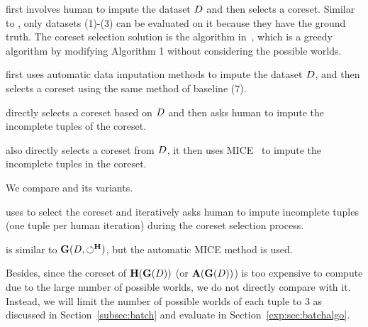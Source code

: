  first involves human to impute the dataset $D$ and then selects a coreset. Similar to \truth, only datasets (1)-(3) can be evaluated on it because they have the ground truth. The coreset selection solution is the algorithm in~\cite{DBLP:conf/icml/MirzasoleimanBL20}, which is a greedy algorithm by modifying Algorithm 1 without considering the possible worlds.


 first uses automatic data imputation methods to impute the dataset $D$, and then selects a coreset using the same method of baseline (7).

 directly selects a coreset based on $D$ and then asks human to impute the incomplete tuples of the coreset.

 also directly selects a coreset from $D$, it then uses MICE~\cite{royston2011multiple} to impute the incomplete tuples in the coreset.

 We compare \ours and its variants.

 uses \ours to select the coreset and iteratively asks human to impute incomplete tuples (one tuple per human iteration) during the coreset selection process.

 is similar to $\mathbf{G}(D,\circlearrowleft^\mathbf{H})$, but the automatic  MICE  method is used.

Besides, since the coreset of $\mathbf{H}(\mathbf{G}(D))$ (or $\mathbf{A}(\mathbf{G}(D))$) is too expensive to compute due to the large number of possible worlds, we do not directly compare with it. Instead, we will limit the number of possible worlds of each tuple to 3 as discussed in Section~\ref{subsec:batch} and evaluate in Section~\ref{exp:sec:batchalgo}.



 







